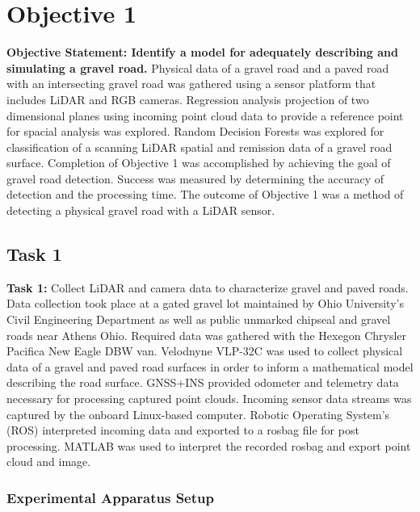 \documentclass[numbered,pdftex]{ohio-etd}
\begin{document}
{	\section{Objective 1}{
		
		{\textbf{Objective Statement: Identify a model for adequately describing and simulating a gravel road.} Physical data of a gravel road and a paved road with an intersecting gravel road was gathered using a sensor platform that includes LiDAR and RGB cameras. Regression analysis projection of two dimensional planes using incoming point cloud data to provide a reference point for spacial analysis was explored. Random Decision Forests was explored for classification of a scanning LiDAR spatial and remission data of a gravel road surface. Completion of Objective 1 was accomplished by achieving the goal of gravel road detection. Success was measured by determining the accuracy of detection and the processing time. The outcome of Objective 1 was a method of detecting a physical gravel road with a LiDAR sensor.}
	
		\subsection{Task 1}{
	
			\textbf{Task 1: }{Collect LiDAR and camera data to characterize gravel and paved roads. Data collection took place at a gated gravel lot maintained by Ohio University's Civil Engineering Department as well as public unmarked chipseal and gravel roads near Athens Ohio. Required data was gathered with the Hexegon Chrysler Pacifica New Eagle DBW van. Velodnyne VLP-32C was used to collect physical data of a gravel and paved road surfaces in order to inform a mathematical model describing the road surface. GNSS+INS provided odometer and telemetry data necessary for processing captured point clouds. Incoming sensor data streams was captured by the onboard Linux-based computer. Robotic Operating System's (ROS) interpreted incoming data and exported to a rosbag file for post processing. MATLAB was used to interpret the recorded rosbag and export point cloud and image. }
	
			\subsubsection{Experimental Apparatus Setup}\label{sec:experimental-apparatus-setup}{
				
}}}}
\end{document}

